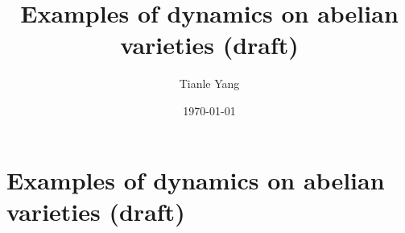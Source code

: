 \documentclass{noteformyself}
\title{Examples of dynamics on abelian varieties (draft)}
\author{Tianle Yang}
\date{\today}
\begin{document}
    \maketitle

    

    \section{Examples of dynamics on abelian varieties (draft)}


    \printbibliography[heading=bibintoc, title={References}] %
\end{document}
